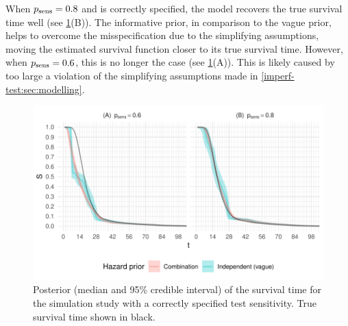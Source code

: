 \documentclass[thesis.tex]{subfiles}
\begin{document}
When $p_\text{sens} = 0.8$ and is correctly specified, the model recovers the true survival time well (see \cref{imperf-test:fig:constant-test-sensitivity}(B)).
The informative prior, in comparison to the vague prior, helps to overcome the misspecification due to the simplifying assumptions, moving the estimated survival function closer to its true survival time.
However, when $p_\text{sens} = 0.6$, this is no longer the case (see \cref{imperf-test:fig:constant-test-sensitivity}(A)).
This is likely caused by too large a violation of the simplifying assumptions made in \cref{imperf-test:sec:modelling}.
\begin{figure}
  \includegraphics[width=\textwidth]{cis-imperfect-testing/sim-constant-sensitivity}
  \caption[Simulation study results with constant test sensitivity]{%
    Posterior (median and 95\% credible interval) of the survival time for the simulation study with a correctly specified test sensitivity.
    True survival time shown in black.
  }
  \label{imperf-test:fig:constant-test-sensitivity}
\end{figure}
\end{document}
